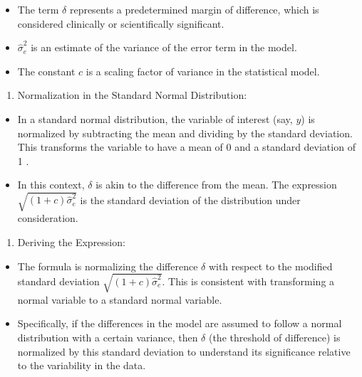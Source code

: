 \documentclass[
  12pt,
  a4paper,
]{article}
\providecommand{\tightlist}{%
  \setlength{\itemsep}{0pt}\setlength{\parskip}{0pt}}
\numberwithin{equation}{section}
\theoremstyle{plain}
\theoremstyle{definition}
\theoremstyle{remark}
\theoremstyle{note}
\begin{document}
\begin{itemize}
\tightlist
\item
  The term \(\delta\) represents a predetermined margin of difference,
  which is considered clinically or scientifically significant.
\item
  \(\hat{\sigma}_e^2\) is an estimate of the variance of the error term
  in the model.
\item
  The constant \(c\) is a scaling factor of variance in the statistical
  model.
\end{itemize}

\begin{enumerate}
\def\labelenumi{\arabic{enumi}.}
\setcounter{enumi}{1}
\tightlist
\item
  Normalization in the Standard Normal Distribution:
\end{enumerate}

\begin{itemize}
\tightlist
\item
  In a standard normal distribution, the variable of interest (say,
  \(y\)) is normalized by subtracting the mean and dividing by the
  standard deviation. This transforms the variable to have a mean of 0
  and a standard deviation of 1 .
\item
  In this context, \(\delta\) is akin to the difference from the mean.
  The expression \(\sqrt{(1+c) \hat{\sigma}_e^2}\) is the standard
  deviation of the distribution under consideration.
\end{itemize}

\begin{enumerate}
\def\labelenumi{\arabic{enumi}.}
\setcounter{enumi}{2}
\tightlist
\item
  Deriving the Expression:
\end{enumerate}

\begin{itemize}
\tightlist
\item
  The formula is normalizing the difference \(\delta\) with respect to
  the modified standard deviation \(\sqrt{(1+c) \hat{\sigma}_e^2}\).
  This is consistent with transforming a normal variable to a standard
  normal variable.
\item
  Specifically, if the differences in the model are assumed to follow a
  normal distribution with a certain variance, then \(\delta\) (the
  threshold of difference) is normalized by this standard deviation to
  understand its significance relative to the variability in the data.
\end{itemize}
\end{document}
